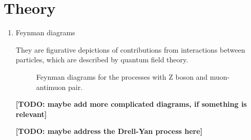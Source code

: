 \documentclass[11pt,a4paper,twoside]{article}
\begin{document}
\section{Theory}
    \begin{enumerate}
        \item Feynman diagrams

        They are figurative depictions of contributions from interactions between particles, which are described by quantum field theory\cite{Jende_Kobel_Pospiech_Bilow_Pedersen_Ould-Saada_Gramstad}.

        \begin{figure}[H]
            \centering

            
        
        
            \caption{Feynman diagrams for the processes with Z boson and muon-antimuon pair.}
            \label{fig:001-Z_MyonAntimyon}
        \end{figure}


        \textbf{[TODO: maybe add more complicated diagrams, if something is relevant]}

        
        \textbf{[TODO: maybe address the Drell-Yan process here]}



\end{enumerate}
\end{document}
